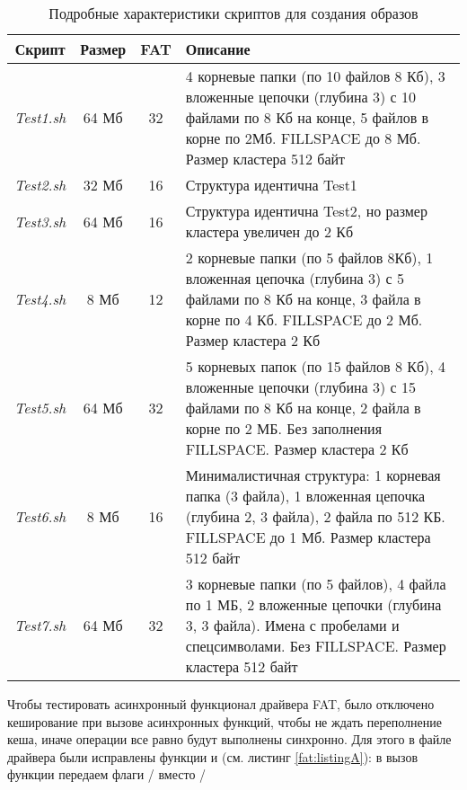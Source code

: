\begin{table}[htbp]
	\renewcommand{\arraystretch}{1.5}
	\centering
	\begin{tabular}{|c|c|c|p{10cm}|}
		\hline
		\textbf{Скрипт} & \textbf{Размер} & \textbf{FAT} & \textbf{Описание} \\
		\hline
		\textit{Test1.sh} & 64 Мб & 32 &   4 корневые папки (по 10 файлов 8 Кб), 3 вложенные цепочки (глубина 3) с 10 файлами по 8 Кб на конце, 5 файлов в корне по  2Мб. FILLSPACE до 8 Мб. Размер кластера 512 байт \\
		\hline
		\textit{Test2.sh} & 32 Мб & 16 &   Структура идентична Test1 \\
		\hline
		\textit{Test3.sh} & 64 Мб & 16 &  Структура идентична Test2, но размер кластера увеличен до 2 Кб\\
		\hline
		\textit{Test4.sh} & 8 Мб & 12 &  2 корневые папки (по 5 файлов 8Кб), 1 вложенная цепочка (глубина 3) с 5 файлами по 8 Кб на конце,  3 файла в корне по 4 Кб. FILLSPACE до 2 Мб. Размер кластера 2 Кб \\
		\hline
		\textit{Test5.sh} & 64 Мб & 32 &  5 корневых папок (по 15 файлов 8 Кб), 4 вложенные цепочки (глубина 3) с 15 файлами по 8 Кб на конце, 2 файла  в корне по 2 МБ. Без заполнения FILLSPACE.  Размер кластера 2 Кб\\
		\hline
		\textit{Test6.sh} & 8 Мб & 16 &  Минималистичная структура: 1 корневая папка (3 файла), 1 вложенная цепочка (глубина 2, 3 файла), 2 файла по 512 КБ.  FILLSPACE до 1 Мб. Размер кластера 512 байт\\
		\hline
		\textit{Test7.sh} & 64 Мб & 32 & 3 корневые папки (по 5 файлов), 4 файла по 1 МБ, 2 вложенные цепочки (глубина 3, 3 файла). Имена с пробелами и спецсимволами. Без FILLSPACE. Размер кластера 512 байт  \\
		\hline
		
	\end{tabular}
	\caption{Подробные характеристики скриптов для создания образов}
	\label{fat:tab:test_detail}
\end{table}

Чтобы тестировать асинхронный функционал драйвера FAT, было отключено кеширование при вызове асинхронных функций, чтобы не ждать переполнение кеша, иначе операции все равно будут выполнены синхронно. Для этого в файле  драйвера были исправлены функции  и  (см. листинг \ref{fat:listingA}): в вызов функции  передаем флаги / вместо / 
 

